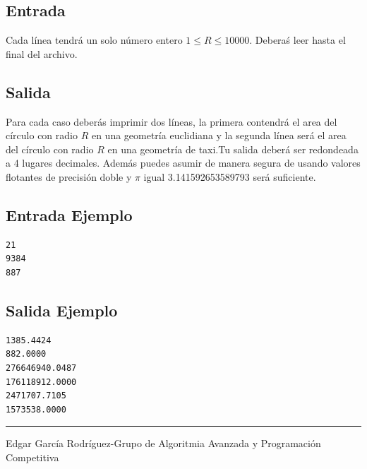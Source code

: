 \documentclass[letter,10pt]{article}
\newcommand{\lyxaddress}[1]{
\par {\raggedright #1
\vspace{1.4em}
\noindent\par}
}
\begin{document}
\subsection*{Entrada}

Cada línea tendrá un solo número entero $1 \leq R \leq 10000$.
Deberaś leer hasta el final del archivo.

\subsection*{Salida}

Para cada caso deberás imprimir dos  líneas, la primera contendrá el area
del círculo con radio $R$ en una geometría euclidiana y la segunda línea será
el area del círculo con radio $R$ en una geometría de taxi.Tu salida deberá ser redondeada a 4 lugares decimales.
Además puedes asumir de manera segura de usando valores flotantes de precisión doble y $\pi$ igual 3.141592653589793 será suficiente.

\subsection*{Entrada Ejemplo}

\begin{verbatim}
21
9384
887
\end{verbatim}

\subsection*{Salida Ejemplo}

\begin{verbatim}
1385.4424
882.0000
276646940.0487
176118912.0000
2471707.7105
1573538.0000
\end{verbatim}

\noindent \rule[0.5ex]{1\columnwidth}{1pt}


\lyxaddress{Edgar García Rodríguez-Grupo de Algoritmia Avanzada y Programación Competitiva}
\end{document}
